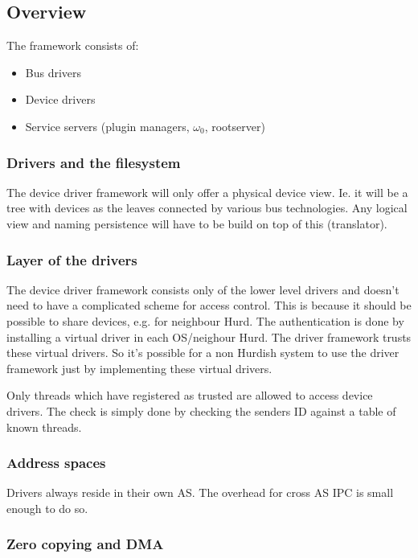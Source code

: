 \documentclass[9pt,a4paper]{extarticle}
\begin{document}
\subsection{Overview}

 The framework consists of: 
 \begin{itemize}
 \item Bus drivers
 \item Device drivers
 \item Service servers (plugin managers, $\omega_0$, rootserver)
 \end{itemize}

\subsubsection{Drivers and the filesystem}
  
  The device driver framework will only offer a physical device view.
  Ie. it will be a tree with devices as the leaves connected by
  various bus technologies.  Any logical view and naming persistence
  will have to be build on top of this (translator).

\subsubsection{Layer of the drivers}

  The device driver framework consists only of the lower level drivers
  and doesn't need to have a complicated scheme for access control.
  This is because it should be possible to share devices, e.g. for
  neighbour Hurd.  The authentication is done by installing a virtual
  driver in each OS/neighour Hurd.  The driver framework trusts these
  virtual drivers.  So it's possible for a non Hurdish system to use
  the driver framework just by implementing these virtual drivers.
  
  Only threads which have registered as trusted are allowed to access
  device drivers.  The check is simply done by checking the senders
  ID against a table of known threads.

\subsubsection{Address spaces}

  Drivers always reside in their own AS. The overhead for cross AS IPC
  is small enough to do so.

\subsubsection{Zero copying and DMA}
  
\end{document}
